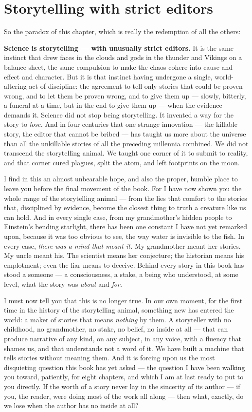 \section*{Storytelling with strict editors}

So the paradox of this chapter, which is really the redemption of all the others:

\textbf{Science is storytelling — with unusually strict editors.} It is the same instinct that drew faces in the clouds and gods in the thunder and Vikings on a balance sheet, the same compulsion to make the chaos cohere into cause and effect and character. But it is that instinct having undergone a single, world-altering act of discipline: the agreement to tell only stories that could be proven wrong, and to let them be proven wrong, and to give them up — slowly, bitterly, a funeral at a time, but in the end to give them up — when the evidence demands it. Science did not stop being storytelling. It invented a way for the story to \emph{lose.} And in four centuries that one strange innovation — the killable story, the editor that cannot be bribed — has taught us more about the universe than all the unkillable stories of all the preceding millennia combined. We did not transcend the storytelling animal. We taught one corner of it to submit to reality, and that corner cured plagues, split the atom, and left footprints on the moon.

I find in this an almost unbearable hope, and also the proper, humble place to leave you before the final movement of the book. For I have now shown you the whole range of the storytelling animal — from the lies that comfort to the stories that, disciplined by evidence, become the closest thing to truth a creature like us can hold. And in every single case, from my grandmother's hidden people to Einstein's bending starlight, there has been one constant I have not yet remarked upon, because it was too obvious to see, the way water is invisible to the fish. In every case, \emph{there was a mind that meant it.} My grandmother meant her stories. My uncle meant his. The scientist means her conjecture; the historian means his emplotment; even the liar means to deceive. Behind every story in this book has stood a someone — a consciousness, a stake, a being who understood, at some level, what the story was \emph{about} and \emph{for.}

I must now tell you that this is no longer true. In our own moment, for the first time in the history of the storytelling animal, something new has entered the world: a maker of stories that means \emph{nothing} by them. A storyteller with no childhood, no grandmother, no stake, no belief, no inside at all — that can produce narrative of any kind, on any subject, in any voice, with a fluency that shames us, and that understands not a word of it. We have built a machine that tells stories without meaning them. And it is forcing upon us the most disquieting question this book has yet asked — the question I have been walking you toward, patiently, for eight chapters, and which I am at last ready to put to you directly. If the worth of a story never lay in the sincerity of its author — if you, the reader, were doing most of the work all along — then what, exactly, do we lose when the author has no inside at all?

